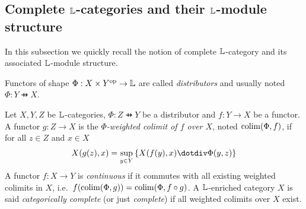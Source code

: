 % 
% 
% 
% 
% 
%
%
%
%
%
%
%

\subsection{Complete $\mathbb{L}$-categories and their $\mathbb{L}$-module structure}

In this subsection we quickly recall the notion of complete $\mathbb{L}$-category and its associated $\mathbb{L}$-module structure.

Functors of shape $\Phi: X\times Y^{\mathrm{op}}\to \mathbb{L}$ are called \emph{distributors} and usually noted $\Phi: Y \pfun X$.


\begin{definition}
Let $X,Y,Z$ be $\mathbb{L}$-categories,
$\Phi: Z\pfun Y$ be a distributor and  $f:Y\to X$ be a functor.
A functor $g:Z\to X$ is the \emph{$\Phi$-weighted colimit of $f$ over $X$}, noted $\mathrm{colim}(\Phi,f)$, if for all $z\in Z$ and $x\in X$
\begin{align}
X(g(z),x)= \sup_{y\in Y}\left\{X(f(y),x)\menus \Phi(y,z)\right\}
\end{align} 
A functor $f:X\to Y$ is \emph{continuous} if it commutes with all existing weighted colimits in $X$, i.e.~$f(\mathrm{colim}(\Phi,g))=\mathrm{colim}(\Phi,f\circ g)$. A $\mathbb{L}$-enriched category 
$X$ is said \emph{categorically complete} (or just \emph{complete}) if all weighted colimits over $X$ exist. 
\end{definition}

